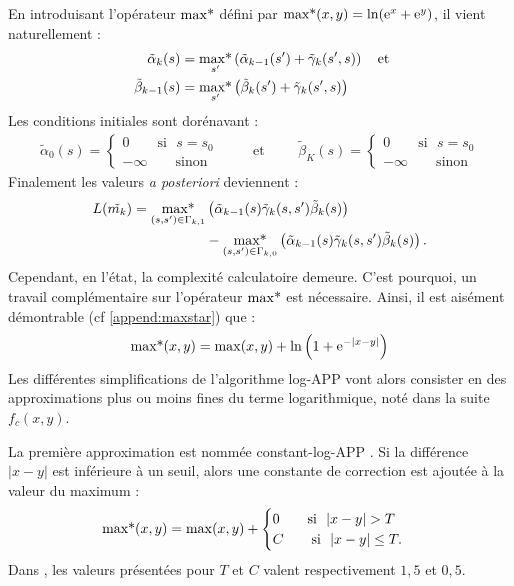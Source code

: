 En introduisant l'opérateur  $\operatorname*{max*}$ défini par $\operatorname*{max*}(x,y) = \ln(\mathrm{e}^x+ \mathrm{e}^y)$, il vient naturellement :
\begin{align*}
	~\tilde{\alpha}_k(s)    & = \operatorname*{max*}\limits_{s'}\left(\tilde{\alpha}_{k-1}(s') + \tilde{\gamma}_k(s', s)\right) 
	\quad\text{et} \\
	~\tilde{\beta}_{k-1}(s) & = \operatorname*{max*}\limits_{s'} \left(\tilde{\beta}_{k}(s') + \tilde{\gamma}_k(s', s)\right)   
\end{align*}
Les conditions initiales sont dorénavant : 
\[
	\begin{split}
		\tilde{\alpha}_0(s)=\begin{cases}
		0 \qquad\text{si~~} s = s_0 \\
		-\infty \qquad\text{sinon}
		\end{cases}
	\end{split}\qquad\text{et}\qquad
	\begin{split}
		\tilde{\beta}_K(s)=\begin{cases}
		0 \qquad\text{si~~} s = s_0 \\
		-\infty \qquad\text{sinon}
		\end{cases}
	\end{split}
\]
Finalement les valeurs \textit{a posteriori} deviennent : 
\begin{align}
	L(\tilde{m_k}) 	= \operatorname*{max*}\limits_{(s,s')\in\Gamma_{k,1}} & \left(\tilde{\alpha}_{k-1}(s) \tilde{\gamma}_k(s,s') \tilde{\beta}_k(s)\right) \notag \\\
	&- \operatorname*{max*}\limits_{(s,s')\in\Gamma_{k,0}}\left(\tilde{\alpha}_{k-1}(s) \tilde{\gamma}_k(s,s') \tilde{\beta}_k(s)\right).				
\end{align}
Cependant, en l'état, la complexité calculatoire demeure. C'est pourquoi, un travail complémentaire sur l'opérateur $\operatorname*{max*}$ 
est nécessaire. Ainsi, il est aisément démontrable (cf \ref{append:maxstar}) que : 
\[\operatorname*{max*}(x,y)=\max(x,y) +\ln\left(1+\mathrm{e}^{-|x-y|}\right) \]
Les différentes simplifications de l'algorithme log-APP vont alors consister en des approximations plus ou moins fines du 
terme logarithmique, noté dans la suite $f_c(x,y)$.

La première approximation est nommée constant-log-APP \cite{constantlog1}. Si la différence $|x-y|$ est inférieure à un 
seuil, alors une constante de correction est ajoutée à la valeur du maximum : 
\begin{equation}
	\operatorname*{max*}(x,y)=\max(x,y) + \begin{cases} 0 \qquad\text{si~~} |x-y| > T \\
	C \qquad\text{si~~} |x-y| \leq T. \end{cases}
\end{equation}
Dans \cite{constantlog2}, les valeurs présentées pour $T$ et $C$ valent respectivement $1,5$ et $0,5$.

